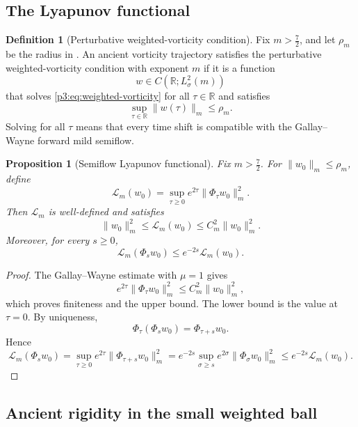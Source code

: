 \documentclass[11pt]{amsart}
\theoremstyle{plain}
\newtheorem{proposition}[proposition]{Proposition}
\theoremstyle{definition}
\newtheorem{definition}[definition]{Definition}
\theoremstyle{remark}
\numberwithin{equation}{section}
\begin{document}
\subsection{The Lyapunov functional}

\begin{definition}[Perturbative weighted-vorticity condition]
\label{p3:def:weighted-vorticity-condition}
Fix \(m>\frac72\), and let \(\rho_m\) be the radius in .
An ancient vorticity trajectory satisfies the perturbative
weighted-vorticity condition with exponent \(m\) if it is a function
\[
   w\in C(\mathbb R;L^2_\sigma(m))
\]
that solves \eqref{p3:eq:weighted-vorticity} for all \(\tau\in\mathbb R\) and
satisfies
\[
   \sup_{\tau\in\mathbb R}\|w(\tau)\|_m\le\rho_m .
\]
Solving for all \(\tau\) means that every time shift is compatible with the
Gallay--Wayne forward mild semiflow.
\end{definition}

\begin{proposition}[Semiflow Lyapunov functional]\label{p3:prop:weighted-lyap}
Fix \(m>\frac72\).  For \(\|w_0\|_m\le\rho_m\), define
\begin{equation}\label{p3:eq:weighted-lyap}
   \mathcal L_m(w_0)
   =
   \sup_{\tau\ge0}e^{2\tau}\|\Phi_\tau w_0\|_m^2 .
\end{equation}
Then \(\mathcal L_m\) is well-defined and satisfies
\begin{equation}\label{p3:eq:weighted-coercive}
   \|w_0\|_m^2
   \le
   \mathcal L_m(w_0)
   \le
   C_m^2\|w_0\|_m^2 .
\end{equation}
Moreover, for every \(s\ge0\),
\begin{equation}\label{p3:eq:weighted-contract}
   \mathcal L_m(\Phi_s w_0)
   \le
   e^{-2s}\mathcal L_m(w_0).
\end{equation}
\end{proposition}

\begin{proof}
The Gallay--Wayne estimate with \(\mu=1\) gives
\[
   e^{2\tau}\|\Phi_\tau w_0\|_m^2
   \le C_m^2\|w_0\|_m^2,
\]
which proves finiteness and the upper bound.  The lower bound is the value at
\(\tau=0\).  By uniqueness,
\[
   \Phi_\tau(\Phi_s w_0)=\Phi_{\tau+s}w_0 .
\]
Hence
\[
   \mathcal L_m(\Phi_s w_0)
   =
   \sup_{\tau\ge0}e^{2\tau}\|\Phi_{\tau+s}w_0\|_m^2
   =
   e^{-2s}\sup_{\sigma\ge s}e^{2\sigma}\|\Phi_\sigma w_0\|_m^2
   \le e^{-2s}\mathcal L_m(w_0).
\]
\end{proof}

\subsection{Ancient rigidity in the small weighted ball}
\end{document}
